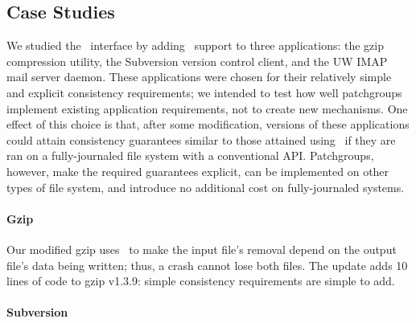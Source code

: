 \subsection{Case Studies}
\label{sec:patchgroup:casestudies}


We studied the \patchgroup\ interface by adding \patchgroup\ support to three
applications: the gzip compression utility, the Subversion version control
client, and the UW IMAP mail server daemon.
%
These applications were chosen for their relatively simple and explicit
consistency requirements; we intended to test how well patchgroups
implement existing application requirements, not to create new mechanisms.
One effect of this choice is that, after some modification, versions of
these applications could attain consistency guarantees similar to those
attained using \patchgroups\ if they are ran on a
fully-journaled file system with a conventional API.  Patchgroups, however,
make the required guarantees explicit, can be implemented on other types of
file system, and introduce no additional cost on fully-journaled systems.


\paragraph{Gzip}
\label{sec:patchgroup:gzip}

Our modified gzip uses \patchgroups\ to make the input file's
removal depend on the output file's data being written; thus,
a crash cannot lose both files. The update adds 10 lines of code to gzip
v1.3.9: simple consistency requirements are simple to add.

\paragraph{Subversion}
\label{sec:patchgroup:svn}


